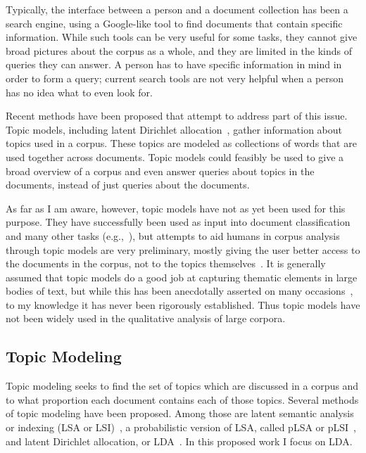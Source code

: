 \documentclass[ms]{byuprop}
\begin{document}
Typically, the interface between a person and a document collection has been a
search engine, using a Google-like tool to find documents that contain specific
information.  While such tools can be very useful for some tasks, they cannot
give broad pictures about the corpus as a whole, and they are limited in the
kinds of queries they can answer.  A person has to have specific information in
mind in order to form a query; current search tools are not very helpful when a
person has no idea what to even look for.

Recent methods have been proposed that attempt to address part of this issue.
Topic models, including latent Dirichlet
allocation~\cite{blei-2003-latent-dirichlet-allocation}, gather information
about topics used in a corpus.  These topics are modeled as collections of
words that are used together across documents.  Topic models could feasibly be
used to give a broad overview of a corpus and even answer queries about topics
in the documents, instead of just queries about the documents.

As far as I am aware, however, topic models have not as yet been used for this
purpose.  They have successfully been used as input into document
classification and many other tasks
(e.g.,~\cite{blei-2008-supervised-topic-models}), but attempts to aid humans in
corpus analysis through topic models are very preliminary, mostly giving the
user better access to the documents in the corpus, not to the topics
themselves~\cite{newman-2010-visualizing-with-topic-maps}.  It is generally
assumed that topic models do a good job at capturing thematic elements in large
bodies of text, but while this has been anecdotally asserted on many
occasions~\cite{griffiths-2004-finding-scientific-topics}, to my knowledge it
has never been rigorously established.  Thus topic models have not been widely
used in the qualitative analysis of large corpora.

\subsection{Topic Modeling}

Topic modeling seeks to find the set of topics which are discussed in a corpus
and to what proportion each document contains each of those topics.  Several
methods of topic modeling have been proposed.  Among those are latent semantic
analysis or indexing (LSA or LSI)~\cite{dumais-1988-latent-semantic-analysis},
a probabilistic version of LSA, called pLSA or pLSI~\cite{hofmann-1999-plsi},
and latent Dirichlet allocation, or
LDA~\cite{blei-2003-latent-dirichlet-allocation}.  In this proposed work I
focus on LDA.
\end{document}
